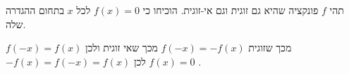 תהי $f$ פונקציה שהיא גם זוגית וגם אי-זוגית. הוכיחו כי $f(x)=0$ לכל $x$ בתחום ההגדרה שלה.
\begin{solbox}
$f(-x)=f(x)$
מכך שזוגית
$f(-x)=-f(x)$
מכך שאי זוגית ולכן
\\
$-f(x)=f(-x)=f(x)$
לכן
$f(x)=0$
.
\end{solbox}
